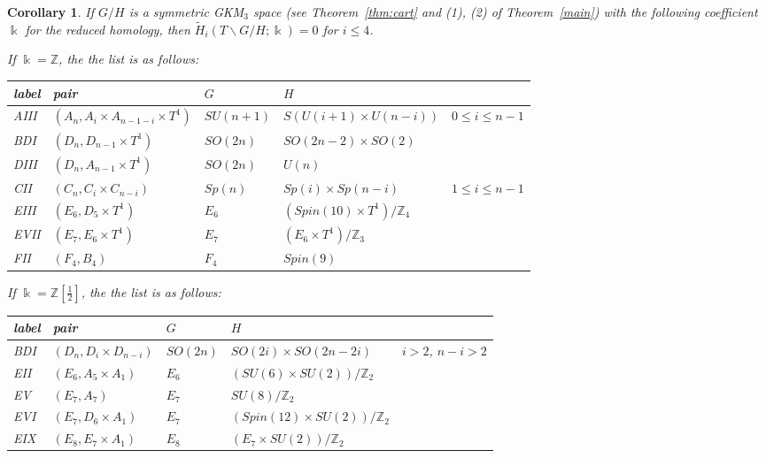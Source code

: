 \documentclass{amsart}
\newtheorem{corollary}[theorem]{Corollary}
\theoremstyle{definition}
\theoremstyle{remark}
\numberwithin{equation}{section}
\begin{document}
\begin{corollary}\label{cor:acyc}
If $G/H$ is a symmetric GKM$_{3}$ space (see Theorem~\ref{thm:cart} and (1), (2) of Theorem~\ref{main})
with the following coefficient $\Bbbk$ for the reduced homology, then $\widetilde{H}_{i}(T\backslash G/H;\Bbbk)=0$ for $i\le 4$.

If $\Bbbk=\mathbb{Z}$, the the list is as follows:
\begin{center}
\begin{tabular}{|l|l|l|l|l|} \hline
label & pair & $G$ & $H$ &  \\ \hline
   {\rm AIII} & $(A_{n},A_{i}\times A_{n-1-i}\times T^{1})$ & $SU(n+1)$ & $S(U(i+1)\times U(n-i))$ & $0\le i\le n-1$ \\
   {\rm BDI}    & $(D_{n}, D_{n-1}\times T^{1})$ & $SO(2n)$ & $SO(2n-2)\times SO(2)$ &    \\
    {\rm DIII} & $(D_{n}, A_{n-1}\times T^{1})$ & $SO(2n)$ & $U(n)$ & \\
    {\rm CII} & $(C_{n},C_{i}\times C_{n-i})$ & $Sp(n)$ & $Sp(i)\times Sp(n-i)$ & $1\le i\le n-1$ \\ 
    {\rm EIII} & $(E_{6}, D_{5}\times T^{1})$ & $E_{6}$ & $(Spin(10)\times T^{1})/\mathbb{Z}_{4}$ & \\
    {\rm EVII} & $(E_{7},E_{6}\times T^{1})$ & $E_{7}$ & $(E_{6}\times T^{1})/\mathbb{Z}_{3}$ & \\
   {\rm FII} & $(F_{4}, B_{4})$ & $F_{4}$ & $Spin(9)$ & \\
   \hline
 \end{tabular}
\end{center}

If $\Bbbk=\mathbb{Z}[\frac{1}{2}]$, the the list is as follows: 
\begin{center}
\begin{tabular}{|l|l|l|l|l|} 
\hline
label & pair  & $G$  & $H$  &  \\ \hline
  {\rm BDI}  & $(D_{n}, D_{i}\times D_{n-i})$ & $SO(2n)$ & $SO(2i)\times SO(2n-2i)$ & $i>2$,   $n-i>2$  \\
    {\rm EII} & $(E_{6}, A_{5}\times A_{1})$ & $E_{6}$ & $(SU(6)\times SU(2))/\mathbb{Z}_{2}$ & \\
      {\rm EV} & $(E_{7},A_{7})$ & $E_{7}$ & $SU(8)/\mathbb{Z}_{2}$ & \\
      {\rm EVI} & $(E_{7},D_{6}\times A_{1})$ & $E_{7}$ & $(Spin(12)\times SU(2))/\mathbb{Z}_{2}$ & \\
    {\rm EIX} & $(E_{8},E_{7}\times A_{1})$ & $E_{8}$ & $(E_{7}\times SU(2))/\mathbb{Z}_{2}$ & \\
   \hline
 \end{tabular}
 \end{center}
\end{corollary}
\end{document}
